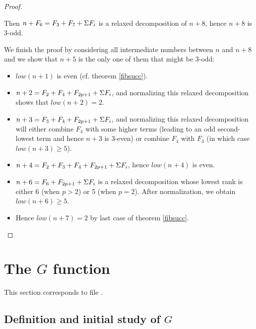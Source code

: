\documentclass[a4paper,11pt]{article}
\begin{document}
\begin{proof}
\begin{enumerate}
\begin{itemize}
    Then $n+F_6 = F_3 + F_7 + \Sigma F_i$ is a relaxed
    decomposition of $n+8$, hence $n+8$ is 3-odd.
  \end{itemize}
  We finish the proof by considering all intermediate numbers between
  $n$ and $n+8$ and we show that $n+5$ is the only one of them that
  might be 3-odd:
  \begin{itemize}
  \item $low(n+1)$ is even (cf. theorem \ref{fibsucc}).
  \item $n+2 = F_2+F_4+F_{2p+1}+\Sigma F_i$, and normalizing this
    relaxed decomposition shows that $low(n+2)=2$.
  \item $n+3 = F_3+F_4+F_{2p+1}+\Sigma F_i$, and normalizing this
    relaxed decomposition will either combine $F_4$ with some
    higher terms (leading to an odd second-lowest term and
    hence $n+3$ is 3-even) or combine $F_4$ with $F_3$ (in which
    case $low(n+3)\ge 5$).
  \item $n+4 = F_2+F_3+F_4+F_{2p+1}+\Sigma F_i$, hence $low(n+4)$ is
    even.
  \item $n+6 = F_6+F_{2p+1}+\Sigma F_i$ is a relaxed decomposition
   whose lowest rank is either 6 (when $p>2$) or 5 (when $p=2$).
   After normalization, we obtain $low(n+6)\ge 5$.
  \item Hence $low(n+7)=2$ by last case of theorem \ref{fibsucc}.
  \end{itemize}
\end{enumerate}
\end{proof}

\section{The $G$ function}

This section corresponds to file .

\subsection{Definition and initial study of $G$}
\end{document}
